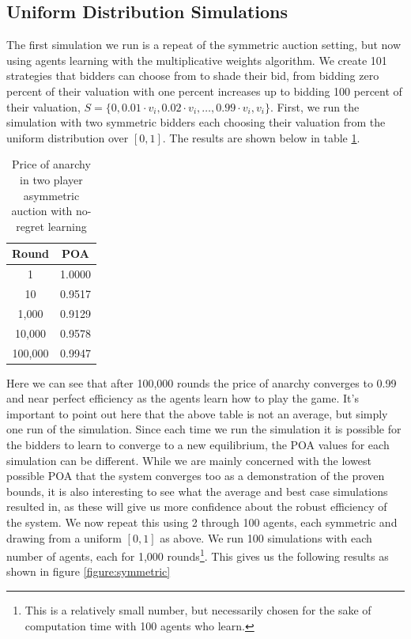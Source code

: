 \documentclass[12pt,twoside]{reedthesis}
\begin{document}
\subsection{Uniform Distribution Simulations}
The first simulation we run is a repeat of the symmetric auction setting, but now using agents learning with the multiplicative weights algorithm. We create 101 strategies that bidders can choose from to shade their bid, from bidding zero percent of their valuation with one percent increases up to bidding 100 percent of their valuation, $S = \{ 0, 0.01 \cdot v_i, 0.02 \cdot v_i, \ldots, 0.99 \cdot v_i, v_i \}$. First, we run the simulation with two symmetric bidders each choosing their valuation from the uniform distribution over $[0,1]$. The results are shown below in table \ref{table:3}.

\begin{table}[h!]
	\begin{center}
		\begin{tabular}{ |c|c| }
			\hline
			Round & POA \\
			\hline
			1 & 1.0000 \\
			10 & 0.9517 \\
			1,000 & 0.9129 \\
			10,000 & 0.9578 \\
			100,000 & 0.9947 \\
			\hline
		\end{tabular}
		\caption{Price of anarchy in two player asymmetric auction with no-regret learning}
		\label{table:3}
	\end{center} 
\end{table}

Here we can see that after 100,000 rounds the price of anarchy converges to 0.99 and near perfect efficiency as the agents learn how to play the game. It's important to point out here that the above table is not an average, but simply one run of the simulation. Since each time we run the simulation it is possible for the bidders to learn to converge to a new equilibrium, the POA values for each simulation can be different. While we are mainly concerned with the lowest possible POA that the system converges too as a demonstration of the proven bounds, it is also interesting to see what the average and best case simulations resulted in, as these will give us more confidence about the robust efficiency of the system. We now repeat this using 2 through 100 agents, each symmetric and drawing from a uniform $[0,1]$ as above. We run 100 simulations with each number of agents, each for 1,000 rounds\footnote{This is a relatively small number, but necessarily chosen for the sake of computation time with 100 agents who learn.}. This gives us the following results as shown in figure \ref{figure:symmetric} 
\end{document}
